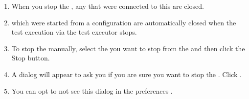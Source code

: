 \begin{enumerate}
\item When you stop the \gdagent{}, any \gdauts{} that were connected to this \gdagent{} are closed.
\item \gdauts{} which were started from a configuration are automatically closed when the test execution via the test executor stops.
\item To stop the \gdaut{} manually, select the \gdaut{} you want to stop from the \gdrunautview{} and then click the {Stop \gdaut{}} button. 
\item A dialog will appear to ask you if you are sure you want to stop the \gdaut{}. Click . 
\item You can opt to not see this dialog in the  preferences . 
\end{enumerate}
